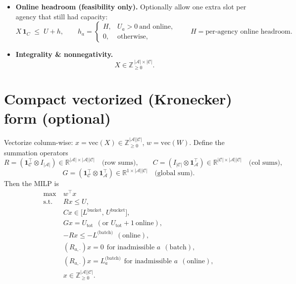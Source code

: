 \documentclass[11pt]{article}
\newcommand{\A}{\mathcal{A}}                 %
\newcommand{\C}{\mathcal{C}}                 %
\newcommand{\Z}{\mathbb{Z}}
\newcommand{\R}{\mathbb{R}}
\newcommand{\onesA}{\mathbf{1}_{\A}}         %
\newcommand{\onesC}{\mathbf{1}_{\C}}         %
\newcommand{\vecop}{\mathrm{vec}}            %
\begin{document}
\begin{itemize}[leftmargin=*]
\item \textbf{Online headroom (feasibility only).} Optionally allow one extra slot
per agency that still had capacity:
\begin{equation*}
X\,\mathbf{1}_C \;\le\; U + h,
\qquad
h_a=\begin{cases}
H, & U_a>0 \ \text{and online},\\
0, & \text{otherwise},
\end{cases}
\qquad H=\text{per-agency online headroom}.
\end{equation*}

\item \textbf{Integrality \& nonnegativity.}
\begin{equation*}
X \in \mathbb{Z}_{\ge 0}^{\,|\A|\times |\C|}.
\end{equation*}

\end{itemize}

\section{Compact vectorized (Kronecker) form (optional)}

Vectorize column-wise: $x=\vecop(X)\in\Z_{\ge 0}^{|\A||\C|}$, $w=\vecop(W)$.
Define the summation operators
\[
R=(\onesC^\top\!\otimes I_{|\A|})\in \R^{|\A|\times |\A||\C|}\quad\text{(row sums)},\qquad
C=(I_{|\C|}\!\otimes \onesA^\top)\in \R^{|\C|\times |\A||\C|}\quad\text{(col sums)},
\]
\[
G=(\onesC^\top\!\otimes \onesA^\top)\in \R^{1\times |\A||\C|}\quad\text{(global sum)}.
\]
Then the MILP is
\begin{equation*}
\begin{aligned}
\max\ & w^\top x \\
\text{s.t. }\
& R x \le U,\\
& C x \in \big[L^{\text{bucket}},\, U^{\text{bucket}}\big],\\
& G x = U_{\mathrm{tot}} \ \ (\text{or }U_{\mathrm{tot}}+1\ \text{online}),\\
& -R x \le -L^{\text{(batch)}}\ \ (\text{online}),\\
& (R_{a,\cdot})x=0\ \ \text{for inadmissible }a\ \ (\text{batch}),\\
& (R_{a,\cdot})x=L^{\text{(batch)}}_a\ \ \text{for inadmissible }a\ \ (\text{online}),\\
& x\in \Z_{\ge 0}^{|\A||\C|}.
\end{aligned}
\end{equation*}
\end{document}

